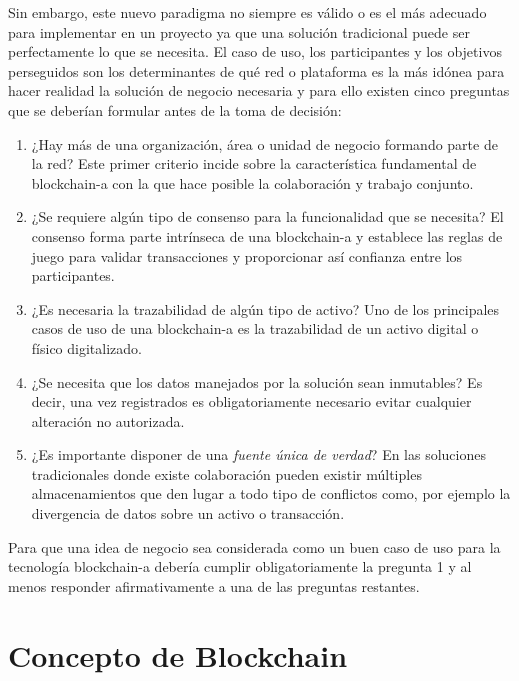 \documentclass[12pt,a4paper, twoside]{report}
\begin{document}
	Sin embargo, este nuevo paradigma no siempre es válido o es el más adecuado para implementar en un proyecto ya que una solución tradicional puede ser perfectamente lo que se necesita. El caso de uso, los participantes y los objetivos perseguidos son los determinantes de qué red o plataforma es la más idónea para hacer realidad la solución de negocio necesaria y para ello existen cinco preguntas que se deberían formular antes de la toma de decisión:
	
	\begin{enumerate}
		\item ¿Hay más de una organización, área o unidad de negocio formando parte de la red? Este primer criterio incide sobre la característica fundamental de \gls{blockchain-a} con la que hace posible la colaboración y trabajo conjunto.
		\item ¿Se requiere algún tipo de consenso para la funcionalidad que se necesita? El consenso forma parte intrínseca de una \gls{blockchain-a} y establece las reglas de juego para validar transacciones y proporcionar así confianza entre los participantes.
		\item ¿Es necesaria la trazabilidad de algún tipo de activo? Uno de los principales casos de uso de una \gls{blockchain-a} es la trazabilidad de un activo digital o físico digitalizado.
		\item ¿Se necesita que los datos manejados por la solución sean inmutables? Es decir, una vez registrados es obligatoriamente necesario evitar cualquier alteración no autorizada.
		\item ¿Es importante disponer de una \textit{fuente única de verdad}? En las soluciones tradicionales donde existe colaboración pueden existir múltiples almacenamientos que den lugar a todo tipo de conflictos como, por ejemplo la divergencia de datos sobre un activo o transacción.
	\end{enumerate}
	
	Para que una idea de negocio sea considerada como un buen caso de uso para la tecnología \gls{blockchain-a} debería cumplir obligatoriamente la pregunta 1 y al menos responder afirmativamente a una de las preguntas restantes.
			
	\section{Concepto de Blockchain}
	
\end{document}
